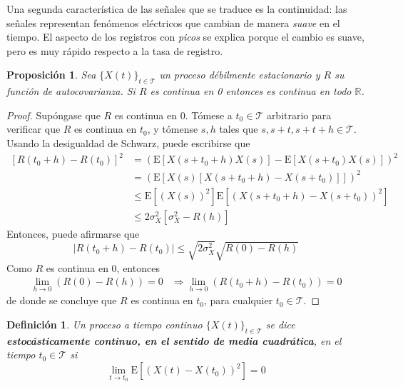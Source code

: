 \documentclass[12pt,letterpaper]{book}
\newtheorem{definicion}{Definición}[chapter]
\newtheorem{proposicion}[teorema]{Proposición}
\newcommand{\R}{\mathbb{R}}
\newcommand{\E}[1]{\mathrm{E}\left[ #1 \right]}
\newcommand{\abso}[1]{\left| #1 \right|}
\newcommand{\xt}{$\{X(t)\}_{t\in \mathcal{T}}$ }
\begin{document}
Una segunda característica de las señales que se traduce es la continuidad: las señales representan fenómenos eléctricos que cambian de manera \textit{suave} en el tiempo.
%
El aspecto de los registros con \textit{picos} se explica porque el cambio es suave, pero es muy rápido respecto a la tasa de registro.

\begin{proposicion}
Sea \xt un proceso débilmente estacionario y $R$ su función de autocovarianza. Si $R$ es continua
en 0 entonces es continua en todo $\R$.
\end{proposicion}

\begin{proof}
Supóngase que $R$ es continua en 0. Tómese a $t_0 \in \mathcal{T}$ arbitrario para verificar que $R$ es continua en $t_0$, y tómense $s,h$ tales que $s,s+t,s+t+h \in\mathcal{T}$. Usando la desigualdad de Schwarz, puede escribirse que
\begin{align*}
\left[ R(t_0+h) -R(t_0) \right]^{2} 
&= \left( \E{X(s+t_0+h)X(s)} - \E{X(s+t_0)X(s)} \right)^{2}  \\
&= \left( \E{X(s)\left[ X(s+t_0+h) - X(s+t_0) \right]} \right)^{2} \\
&\leq \E{\left( X(s) \right)^{2}} \E{\left( X(s+t_0+h) - X(s+t_0) \right)^{2}} \\
&\leq 2 \sigma_X^{2} \left[ \sigma_X^{2} - R(h) \right]
\end{align*}
Entonces, puede afirmarse que
\begin{equation*}
\abso{R(t_0+h) -R(t_0)} \leq \sqrt{2 \sigma_X^{2}} \sqrt{R(0) - R(h)}
\end{equation*}
Como $R$ es continua en 0, entonces 
\begin{align*}
\lim_{h\rightarrow 0} (R(0)-R(h)) = 0 &\Rightarrow \lim_{h\rightarrow 0} (R(t_0+h)-R(t_0)) = 0
\end{align*}
de donde se concluye que $R$ es continua en $t_0$, para cualquier $t_0\in \mathcal{T}$.
\end{proof}    

\begin{definicion}%
Un proceso a tiempo continuo \xt se dice \textbf{estocásticamente continuo, en el sentido de media cuadrática}, en el tiempo $t_0\in \mathcal{T}$ si
\begin{equation*}
\lim_{t \rightarrow t_0} \E{\left( X(t) - X(t_0) \right)^{2}} = 0
\end{equation*}
\label{cont_est}
\end{definicion}
\end{document}
